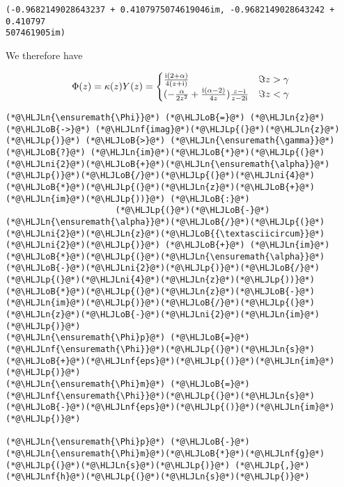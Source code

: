 \documentclass[12pt,a4paper]{article}
\newcommand{\HLJLn}[1]{#1}
\newcommand{\HLJLnf}[1]{\textcolor[RGB]{66,102,213}{#1}}
\newcommand{\HLJLni}[1]{\textcolor[RGB]{59,151,46}{#1}}
\newcommand{\HLJLoB}[1]{\textcolor[RGB]{102,102,102}{\textbf{#1}}}
\newcommand{\HLJLp}[1]{#1}
\def\I{ {\rm i} }
\begin{document}
\begin{lstlisting}
(-0.9682149028643237 + 0.4107975074619046im, -0.9682149028643242 + 0.410797
507461905im)
\end{lstlisting}


We therefore have

\[
\Phi(z)  = \kappa(z) Y(z) = \begin{cases}
 {\I (2+\alpha) \over 4 (z+ \I)}  & \Im z > \gamma \\
(-{\alpha \over 2 z^2}+{\I (\alpha-2) \over 4 z}  ) {z - \I  \over z - 2\I} & \Im z < \gamma
\end{cases}
\]

\begin{lstlisting}
(*@\HLJLn{\ensuremath{\Phi}}@*) (*@\HLJLoB{=}@*) (*@\HLJLn{z}@*) (*@\HLJLoB{->}@*) (*@\HLJLnf{imag}@*)(*@\HLJLp{(}@*)(*@\HLJLn{z}@*)(*@\HLJLp{)}@*) (*@\HLJLoB{>}@*) (*@\HLJLn{\ensuremath{\gamma}}@*) (*@\HLJLoB{?}@*) (*@\HLJLn{im}@*)(*@\HLJLoB{*}@*)(*@\HLJLp{(}@*)(*@\HLJLni{2}@*)(*@\HLJLoB{+}@*)(*@\HLJLn{\ensuremath{\alpha}}@*)(*@\HLJLp{)}@*)(*@\HLJLoB{/}@*)(*@\HLJLp{(}@*)(*@\HLJLni{4}@*)(*@\HLJLoB{*}@*)(*@\HLJLp{(}@*)(*@\HLJLn{z}@*)(*@\HLJLoB{+}@*)(*@\HLJLn{im}@*)(*@\HLJLp{))}@*) (*@\HLJLoB{:}@*)
                      (*@\HLJLp{(}@*)(*@\HLJLoB{-}@*)(*@\HLJLn{\ensuremath{\alpha}}@*)(*@\HLJLoB{/}@*)(*@\HLJLp{(}@*)(*@\HLJLni{2}@*)(*@\HLJLn{z}@*)(*@\HLJLoB{{\textasciicircum}}@*)(*@\HLJLni{2}@*)(*@\HLJLp{)}@*) (*@\HLJLoB{+}@*) (*@\HLJLn{im}@*)(*@\HLJLoB{*}@*)(*@\HLJLp{(}@*)(*@\HLJLn{\ensuremath{\alpha}}@*)(*@\HLJLoB{-}@*)(*@\HLJLni{2}@*)(*@\HLJLp{)}@*)(*@\HLJLoB{/}@*)(*@\HLJLp{(}@*)(*@\HLJLni{4}@*)(*@\HLJLn{z}@*)(*@\HLJLp{))}@*)(*@\HLJLoB{*}@*)(*@\HLJLp{(}@*)(*@\HLJLn{z}@*)(*@\HLJLoB{-}@*)(*@\HLJLn{im}@*)(*@\HLJLp{)}@*)(*@\HLJLoB{/}@*)(*@\HLJLp{(}@*)(*@\HLJLn{z}@*)(*@\HLJLoB{-}@*)(*@\HLJLni{2}@*)(*@\HLJLn{im}@*)(*@\HLJLp{)}@*)
(*@\HLJLn{\ensuremath{\Phi}p}@*) (*@\HLJLoB{=}@*) (*@\HLJLnf{\ensuremath{\Phi}}@*)(*@\HLJLp{(}@*)(*@\HLJLn{s}@*)(*@\HLJLoB{+}@*)(*@\HLJLnf{eps}@*)(*@\HLJLp{()}@*)(*@\HLJLn{im}@*)(*@\HLJLp{)}@*)
(*@\HLJLn{\ensuremath{\Phi}m}@*) (*@\HLJLoB{=}@*) (*@\HLJLnf{\ensuremath{\Phi}}@*)(*@\HLJLp{(}@*)(*@\HLJLn{s}@*)(*@\HLJLoB{-}@*)(*@\HLJLnf{eps}@*)(*@\HLJLp{()}@*)(*@\HLJLn{im}@*)(*@\HLJLp{)}@*)

(*@\HLJLn{\ensuremath{\Phi}p}@*) (*@\HLJLoB{-}@*) (*@\HLJLn{\ensuremath{\Phi}m}@*)(*@\HLJLoB{*}@*)(*@\HLJLnf{g}@*)(*@\HLJLp{(}@*)(*@\HLJLn{s}@*)(*@\HLJLp{)}@*) (*@\HLJLp{,}@*) (*@\HLJLnf{h}@*)(*@\HLJLp{(}@*)(*@\HLJLn{s}@*)(*@\HLJLp{)}@*)
\end{lstlisting}
\end{document}
